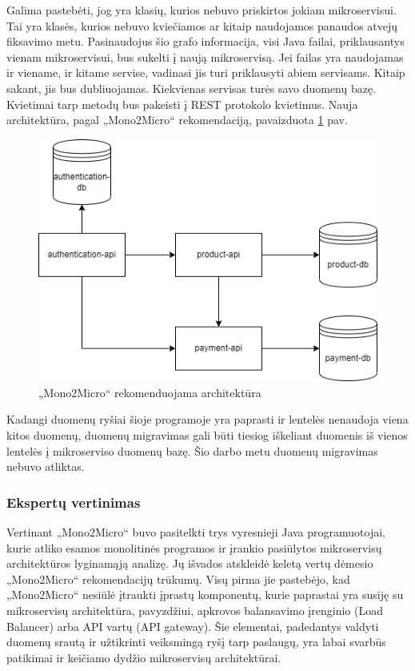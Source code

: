 \documentclass{VUMIFPSbakalaurinis}
\begin{document}
Galima pastebėti, jog yra klasių, kurios nebuvo priskirtos jokiam mikroservisui. Tai yra klasės, kurios nebuvo kviečiamos ar kitaip naudojamos panaudos atvejų fiksavimo metu. Pasinaudojus šio grafo informacija, visi Java failai, priklausantys vienam mikroservisui, bus sukelti į naują mikroservisą. Jei failas yra naudojamas ir viename, ir kitame servise, vadinasi jis turi priklausyti abiem servisams. Kitaip sakant, jis bus dubliuojamas. Kiekvienas servisas turės savo duomenų bazę. Kvietimai tarp metodų bus pakeisti į REST protokolo kvietimus. Nauja architektūra, pagal „Mono2Micro“ rekomendaciją, pavaizduota \ref{img:nauja-architektura} pav. 

\begin{figure}[H]
    \centering
    \includegraphics[scale=0.6]{img/microservices-new.png}
    \caption{„Mono2Micro“ rekomenduojama architektūra}
    \label{img:nauja-architektura}
\end{figure}

Kadangi duomenų ryšiai šioje programoje yra paprasti ir lentelės nenaudoja viena kitos duomenų, duomenų migravimas gali būti tiesiog iškeliant duomenis iš vienos lentelės į mikroserviso duomenų bazę. Šio darbo metu duomenų migravimas nebuvo atliktas.

\subsubsection{Ekspertų vertinimas}
Vertinant „Mono2Micro“ buvo pasitelkti trys vyresnieji Java programuotojai, kurie atliko esamos monolitinės programos ir įrankio pasiūlytos mikroservisų architektūros lyginamąją analizę. Jų išvados atskleidė keletą vertų dėmesio „Mono2Micro“ rekomendacijų trūkumų. Visų pirma jie pastebėjo, kad „Mono2Micro“ nesiūlė įtraukti įprastų komponentų, kurie paprastai yra susiję su mikroservisų architektūra, pavyzdžiui, apkrovos balansavimo įrenginio (Load Balancer) arba API vartų (API gateway). Šie elementai, padedantys valdyti duomenų srautą ir užtikrinti veiksmingą ryšį tarp paslaugų, yra labai svarbūs patikimai ir keičiamo dydžio mikroservisų architektūrai.
\end{document}
